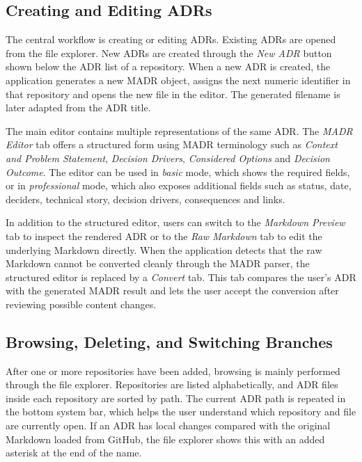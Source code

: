 \subsection{Creating and Editing ADRs}

The central workflow is creating or editing ADRs. Existing ADRs are opened from the file explorer. New ADRs are created through the \textit{New ADR} button shown below the ADR list of a repository. When a new ADR is created, the application generates a new MADR object, assigns the next numeric identifier in that repository and opens the new file in the editor. The generated filename is later adapted from the ADR title.

The main editor contains multiple representations of the same ADR. The \textit{MADR Editor} tab offers a structured form using MADR terminology such as \textit{Context and Problem Statement}, \textit{Decision Drivers}, \textit{Considered Options} and \textit{Decision Outcome}. The editor can be used in \textit{basic} mode, which shows the required fields, or in \textit{professional} mode, which also exposes additional fields such as status, date, deciders, technical story, decision drivers, consequences and links.

In addition to the structured editor, users can switch to the \textit{Markdown Preview} tab to inspect the rendered ADR or to the \textit{Raw Markdown} tab to edit the underlying Markdown directly. When the application detects that the raw Markdown cannot be converted cleanly through the MADR parser, the structured editor is replaced by a \textit{Convert} tab. This tab compares the user's ADR with the generated MADR result and lets the user accept the conversion after reviewing possible content changes.

\subsection{Browsing, Deleting, and Switching Branches}

After one or more repositories have been added, browsing is mainly performed through the file explorer. Repositories are listed alphabetically, and ADR files inside each repository are sorted by path. The current ADR path is repeated in the bottom system bar, which helps the user understand which repository and file are currently open. If an ADR has local changes compared with the original Markdown loaded from GitHub, the file explorer shows this with an added asterisk at the end of the name.

